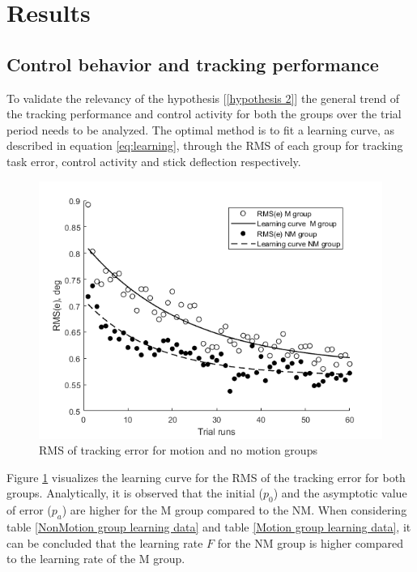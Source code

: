 \documentclass[conference]{IEEEtran}
\begin{document}

\section{Results}

\subsection{Control behavior and tracking performance}

To validate the relevancy of the hypothesis [\ref{hypothesis 2}] the general trend of the tracking performance and control activity for both the groups over the trial period needs to be analyzed. The optimal method is to fit a learning curve, as described in equation \ref{eq:learning}, through the RMS of each group for tracking task error, control activity and stick deflection respectively. \\

\begin{figure}[h!]
\centering
\includegraphics[width = \linewidth]{images/RMS_e.png}
\caption{RMS of tracking error for motion and no motion groups}
\label{fig:RMSerror}
\end{figure}

Figure \ref{fig:RMSerror} visualizes the learning curve for the RMS of the tracking error for both groups. Analytically, it is observed that the initial ($p_0$) and the asymptotic value of error ($p_a$) are higher for the M group compared to the NM. When considering table \ref{NonMotion group learning data} and table \ref{Motion group learning data}, it can be concluded that the learning rate $F$ for the NM group is higher compared to the learning rate of the M group.\\
\end{document}
